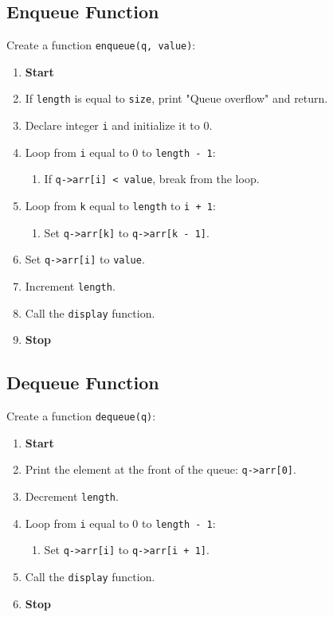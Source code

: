 {  \subsection{Enqueue Function}
  Create a function \texttt{enqueue(q, value)}:
  \begin{enumerate}[label=\arabic*:,left=0pt]
    \item \textbf{Start}
    \item If \texttt{length} is equal to \texttt{size}, print "Queue overflow" and return.
    \item Declare integer \texttt{i} and initialize it to 0.
    \item Loop from \texttt{i} equal to 0 to \texttt{length - 1}:
          \begin{enumerate}[label=3.\arabic*:, start=1]
            \item If \texttt{q->arr[i] < value}, break from the loop.
          \end{enumerate}
    \item Loop from \texttt{k} equal to \texttt{length} to \texttt{i + 1}:
          \begin{enumerate}[label=4.\arabic*:, start=1]
            \item Set \texttt{q->arr[k]} to \texttt{q->arr[k - 1]}.
          \end{enumerate}
    \item Set \texttt{q->arr[i]} to \texttt{value}.
    \item Increment \texttt{length}.
    \item Call the \texttt{display} function.
    \item \textbf{Stop}
  \end{enumerate}

  \subsection{Dequeue Function}
  Create a function \texttt{dequeue(q)}:
  \begin{enumerate}[label=\arabic*:,left=0pt]
    \item \textbf{Start}
    \item Print the element at the front of the queue: \texttt{q->arr[0]}.
    \item Decrement \texttt{length}.
    \item Loop from \texttt{i} equal to 0 to \texttt{length - 1}:
          \begin{enumerate}[label=3.\arabic*:, start=1]
            \item Set \texttt{q->arr[i]} to \texttt{q->arr[i + 1]}.
          \end{enumerate}
    \item Call the \texttt{display} function.
    \item \textbf{Stop}
  \end{enumerate}

}
